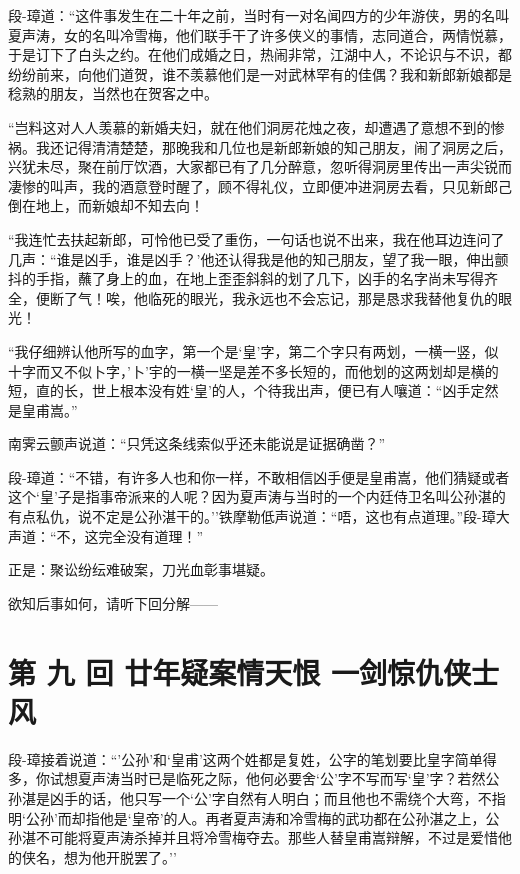 \documentclass[12pt,oneside]{book}
\begin{document}
段-璋道：``这件事发生在二十年之前，当时有一对名闻四方的少年游侠，男的名叫夏声涛，女的名叫冷雪梅，他们联手干了许多侠义的事情，志同道合，两情悦慕，于是订下了白头之约。在他们成婚之日，热闹非常，江湖中人，不论识与不识，都纷纷前来，向他们道贺，谁不羡慕他们是一对武林罕有的佳偶？我和新郎新娘都是稔熟的朋友，当然也在贺客之中。

``岂料这对人人羡慕的新婚夫妇，就在他们洞房花烛之夜，却遭遇了意想不到的惨祸。我还记得清清楚楚，那晚我和几位也是新郎新娘的知己朋友，闹了洞房之后，兴犹未尽，聚在前厅饮酒，大家都已有了几分醉意，忽听得洞房里传出一声尖锐而凄惨的叫声，我的酒意登时醒了，顾不得礼仪，立即便冲进洞房去看，只见新郎己倒在地上，而新娘却不知去向！

``我连忙去扶起新郎，可怜他已受了重伤，一句话也说不出来，我在他耳边连问了几声：``谁是凶手，谁是凶手？'他还认得我是他的知己朋友，望了我一眼，伸出颤抖的手指，蘸了身上的血，在地上歪歪斜斜的划了几下，凶手的名字尚未写得齐全，便断了气！唉，他临死的眼光，我永远也不会忘记，那是恳求我替他复仇的眼光！

``我仔细辨认他所写的血字，第一个是`皇'字，第二个字只有两划，一横一竖，似十字而又不似卜字，'卜'宇的一横一坚是差不多长短的，而他划的这两划却是横的短，直的长，世上根本没有姓`皇'的人，个待我出声，便已有人嚷道：``凶手定然是皇甫嵩。''

南霁云颤声说道：``只凭这条线索似乎还未能说是证据确凿？''

段-璋道：``不错，有许多人也和你一样，不敢相信凶手便是皇甫嵩，他们猜疑或者这个`皇'子是指事帝派来的人呢？因为夏声涛与当时的一个内廷侍卫名叫公孙湛的有点私仇，说不定是公孙湛干的。''铁摩勒低声说道：``唔，这也有点道理。''段-璋大声道：``不，这完全没有道理！''

正是：聚讼纷纭难破案，刀光血彰事堪疑。

欲知后事如何，请听下回分解------

\chapter{第 九 回 廿年疑案情天恨
一剑惊仇侠士风}\label{ux7b2c-ux4e5d-ux56de-ux5effux5e74ux7591ux6848ux60c5ux5929ux6068-ux4e00ux5251ux60caux4ec7ux4fa0ux58ebux98ce}

段-璋接着说道：``'公孙'和`皇甫'这两个姓都是复姓，公字的笔划要比皇字简单得多，你试想夏声涛当时已是临死之际，他何必要舍`公'字不写而写`皇'字？若然公孙湛是凶手的话，他只写一个`公'字自然有人明白；而且他也不需绕个大弯，不指明`公孙'而却指他是`皇帝'的人。再者夏声涛和冷雪梅的武功都在公孙湛之上，公孙湛不可能将夏声涛杀掉并且将冷雪梅夺去。那些人替皇甫嵩辩解，不过是爱惜他的侠名，想为他开脱罢了。''
\end{document}
